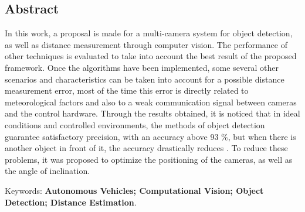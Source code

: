 \begin{flushright}
\chapter*{Abstract}
\end{flushright}

\noindent
In this work, a proposal is made for a multi-camera system for object detection, as well as distance measurement through computer vision. The performance of other techniques is evaluated to take into account the best result of the proposed framework. Once the algorithms have been implemented, some several other scenarios and characteristics can be taken into account for a possible distance measurement error, most of the time this error is directly related to meteorological factors and also to a weak communication signal between cameras and the control hardware. Through the results obtained, it is noticed that in ideal conditions and controlled environments, the methods of object detection guarantee satisfactory precision, with an accuracy above 93 \%, but when there is another object in front of it, the accuracy drastically reduces . To reduce these problems, it was proposed to optimize the positioning of the cameras, as well as the angle of inclination.


\noindent
Keywords: \textbf{Autonomous Vehicles; Computational Vision; Object Detection; Distance Estimation}.